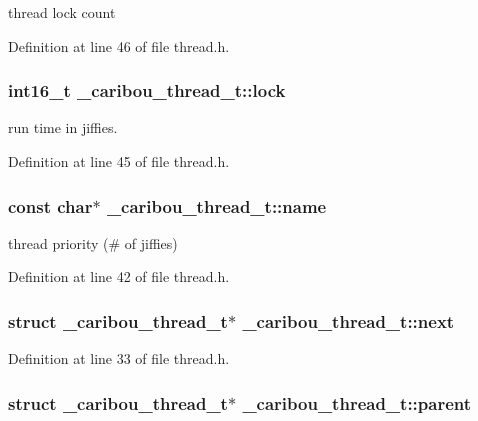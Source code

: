 thread lock count 



Definition at line 46 of file thread.\-h.

\hypertarget{struct__caribou__thread__t_a3f291721c2674ea6c5776d014357144b}{
\subsubsection[{lock}]{\setlength{\rightskip}{0pt plus 5cm}int16\-\_\-t \-\_\-caribou\-\_\-thread\-\_\-t\-::lock}}\label{struct__caribou__thread__t_a3f291721c2674ea6c5776d014357144b}


run time in jiffies. 



Definition at line 45 of file thread.\-h.

\hypertarget{struct__caribou__thread__t_af6982a95fce8e2c99023a803d903707b}{
\subsubsection[{name}]{\setlength{\rightskip}{0pt plus 5cm}const char$\ast$ \-\_\-caribou\-\_\-thread\-\_\-t\-::name}}\label{struct__caribou__thread__t_af6982a95fce8e2c99023a803d903707b}


thread priority (\# of jiffies) 



Definition at line 42 of file thread.\-h.

\hypertarget{struct__caribou__thread__t_a584ef536a58df0aa0e097add451a66e4}{
\subsubsection[{next}]{\setlength{\rightskip}{0pt plus 5cm}struct {\bf \-\_\-caribou\-\_\-thread\-\_\-t}$\ast$ \-\_\-caribou\-\_\-thread\-\_\-t\-::next}}\label{struct__caribou__thread__t_a584ef536a58df0aa0e097add451a66e4}


Definition at line 33 of file thread.\-h.

\hypertarget{struct__caribou__thread__t_a1ecb216e2a946081e642ad98bbbbd9e7}{
\subsubsection[{parent}]{\setlength{\rightskip}{0pt plus 5cm}struct {\bf \-\_\-caribou\-\_\-thread\-\_\-t}$\ast$ \-\_\-caribou\-\_\-thread\-\_\-t\-::parent}}\label{struct__caribou__thread__t_a1ecb216e2a946081e642ad98bbbbd9e7}


